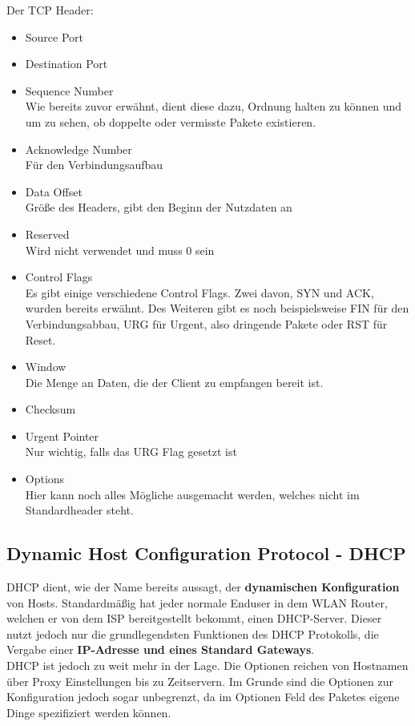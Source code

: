 \documentclass[12pt,a4paper]{report}
\begin{document}
Der TCP Header:\\
\begin{itemize}
\item Source Port
\item Destination Port
\item Sequence Number\\
Wie bereits zuvor erwähnt, dient diese dazu, Ordnung halten zu können und um zu sehen, ob doppelte oder vermisste Pakete existieren.
\item Acknowledge Number\\
Für den Verbindungsaufbau
\item Data Offset\\
Größe des Headers, gibt den Beginn der Nutzdaten an
\item Reserved\\
Wird nicht verwendet und muss 0 sein
\item Control Flags\\
Es gibt einige verschiedene Control Flags. Zwei davon, SYN und ACK, wurden bereits erwähnt. Des Weiteren gibt es noch beispielsweise FIN für den Verbindungsabbau, URG für Urgent, also dringende Pakete oder RST für Reset.
\item Window \\
Die Menge an Daten, die der Client zu empfangen bereit ist.
\item Checksum
\item Urgent Pointer\\
Nur wichtig, falls das URG Flag gesetzt ist
\item Options\\
Hier kann noch alles Mögliche ausgemacht werden, welches nicht im Standardheader steht.
\end{itemize}
\subsection{Dynamic Host Configuration Protocol - DHCP}\label{ssec:dhcp}
DHCP dient, wie der Name bereits aussagt, der \textbf{dynamischen Konfiguration} von Hosts. Standardmäßig hat jeder normale Enduser in dem WLAN Router, welchen er von dem ISP bereitgestellt bekommt, einen DHCP-Server. Dieser nutzt jedoch nur die grundlegendsten Funktionen des DHCP Protokolls, die Vergabe einer \textbf{IP-Adresse und eines Standard Gateways}.\\
DHCP ist jedoch zu weit mehr in der Lage. Die Optionen reichen von Hostnamen über Proxy Einstellungen bis zu Zeitservern. Im Grunde sind die Optionen zur Konfiguration jedoch sogar unbegrenzt, da im Optionen Feld des Paketes eigene Dinge spezifiziert werden können.\\
\end{document}
